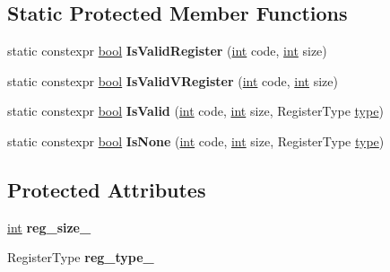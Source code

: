 \subsection*{Static Protected Member Functions}
\begin{DoxyCompactItemize}
\item 
\mbox{\label{classv8_1_1internal_1_1CPURegister_a1a938402f737e5ec2392aea186d0d2d0}} 
static constexpr \mbox{\hyperlink{classbool}{bool}} {\bfseries Is\+Valid\+Register} (\mbox{\hyperlink{classint}{int}} code, \mbox{\hyperlink{classint}{int}} size)
\item 
\mbox{\label{classv8_1_1internal_1_1CPURegister_a61464308c1852e0b0d6c4ccef81b1e12}} 
static constexpr \mbox{\hyperlink{classbool}{bool}} {\bfseries Is\+Valid\+V\+Register} (\mbox{\hyperlink{classint}{int}} code, \mbox{\hyperlink{classint}{int}} size)
\item 
\mbox{\label{classv8_1_1internal_1_1CPURegister_aa287dd7dc115e2c2ddce40632f14954c}} 
static constexpr \mbox{\hyperlink{classbool}{bool}} {\bfseries Is\+Valid} (\mbox{\hyperlink{classint}{int}} code, \mbox{\hyperlink{classint}{int}} size, Register\+Type \mbox{\hyperlink{classstd_1_1conditional_1_1type}{type}})
\item 
\mbox{\label{classv8_1_1internal_1_1CPURegister_a82f826d06a92a87bf4fe38b0c6e582fa}} 
static constexpr \mbox{\hyperlink{classbool}{bool}} {\bfseries Is\+None} (\mbox{\hyperlink{classint}{int}} code, \mbox{\hyperlink{classint}{int}} size, Register\+Type \mbox{\hyperlink{classstd_1_1conditional_1_1type}{type}})
\end{DoxyCompactItemize}
\subsection*{Protected Attributes}
\begin{DoxyCompactItemize}
\item 
\mbox{\label{classv8_1_1internal_1_1CPURegister_a45bf2265fceda97bb7fdc87afe951caf}} 
\mbox{\hyperlink{classint}{int}} {\bfseries reg\+\_\+size\+\_\+}
\item 
\mbox{\label{classv8_1_1internal_1_1CPURegister_a6a98b5c28b81579d11c5dab973d26be0}} 
Register\+Type {\bfseries reg\+\_\+type\+\_\+}
\end{DoxyCompactItemize}
